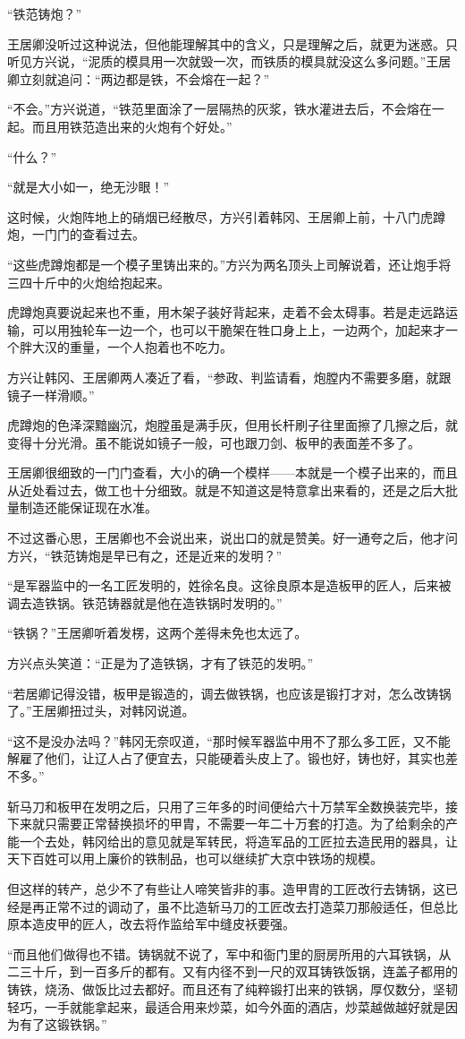 “铁范铸炮？”

王居卿没听过这种说法，但他能理解其中的含义，只是理解之后，就更为迷惑。只听见方兴说，“泥质的模具用一次就毁一次，而铁质的模具就没这么多问题。”王居卿立刻就追问：“两边都是铁，不会熔在一起？”

“不会。”方兴说道，“铁范里面涂了一层隔热的灰浆，铁水灌进去后，不会熔在一起。而且用铁范造出来的火炮有个好处。”

“什么？”

“就是大小如一，绝无沙眼！”

这时候，火炮阵地上的硝烟已经散尽，方兴引着韩冈、王居卿上前，十八门虎蹲炮，一门门的查看过去。

“这些虎蹲炮都是一个模子里铸出来的。”方兴为两名顶头上司解说着，还让炮手将三四十斤中的火炮给抱起来。

虎蹲炮真要说起来也不重，用木架子装好背起来，走着不会太碍事。若是走远路运输，可以用独轮车一边一个，也可以干脆架在牲口身上上，一边两个，加起来才一个胖大汉的重量，一个人抱着也不吃力。

方兴让韩冈、王居卿两人凑近了看，“参政、判监请看，炮膛内不需要多磨，就跟镜子一样滑顺。”

虎蹲炮的色泽深黯幽沉，炮膛虽是满手灰，但用长杆刷子往里面擦了几擦之后，就变得十分光滑。虽不能说如镜子一般，可也跟刀剑、板甲的表面差不多了。

王居卿很细致的一门门查看，大小的确一个模样——本就是一个模子出来的，而且从近处看过去，做工也十分细致。就是不知道这是特意拿出来看的，还是之后大批量制造还能保证现在水准。

不过这番心思，王居卿也不会说出来，说出口的就是赞美。好一通夸之后，他才问方兴，“铁范铸炮是早已有之，还是近来的发明？”

“是军器监中的一名工匠发明的，姓徐名良。这徐良原本是造板甲的匠人，后来被调去造铁锅。铁范铸器就是他在造铁锅时发明的。”

“铁锅？”王居卿听着发楞，这两个差得未免也太远了。

方兴点头笑道：“正是为了造铁锅，才有了铁范的发明。”

“若居卿记得没错，板甲是锻造的，调去做铁锅，也应该是锻打才对，怎么改铸锅了。”王居卿扭过头，对韩冈说道。

“这不是没办法吗？”韩冈无奈叹道，“那时候军器监中用不了那么多工匠，又不能解雇了他们，让辽人占了便宜去，只能硬着头皮上了。锻也好，铸也好，其实也差不多。”

斩马刀和板甲在发明之后，只用了三年多的时间便给六十万禁军全数换装完毕，接下来就只需要正常替换损坏的甲胄，不需要一年二十万套的打造。为了给剩余的产能一个去处，韩冈给出的意见就是军转民，将造军品的工匠拉去造民用的器具，让天下百姓可以用上廉价的铁制品，也可以继续扩大京中铁场的规模。

但这样的转产，总少不了有些让人啼笑皆非的事。造甲胄的工匠改行去铸锅，这已经是再正常不过的调动了，虽不比造斩马刀的工匠改去打造菜刀那般适任，但总比原本造皮甲的匠人，改去将作监给军中缝皮袄要强。

“而且他们做得也不错。铸锅就不说了，军中和衙门里的厨房所用的六耳铁锅，从二三十斤，到一百多斤的都有。又有内径不到一尺的双耳铸铁饭锅，连盖子都用的铸铁，烧汤、做饭比过去都好。而且还有了纯粹锻打出来的铁锅，厚仅数分，坚韧轻巧，一手就能拿起来，最适合用来炒菜，如今外面的酒店，炒菜越做越好就是因为有了这锻铁锅。”
